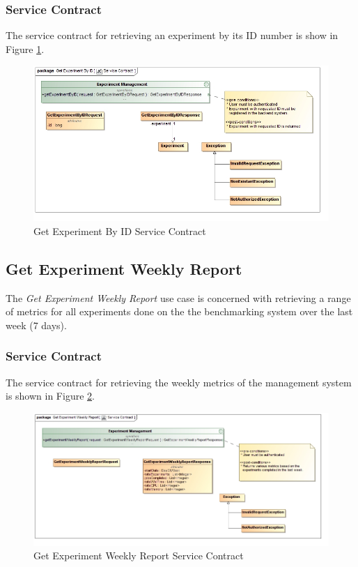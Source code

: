 \subsubsection{Service Contract}
The service contract for retrieving an experiment by its ID number is show in
Figure \ref{fig:getExperimentByIDServiceContract}.
\begin{figure}[H]
  \begin{center}
  \includegraphics[scale=0.38]{../Diagrams and Charts/Experiment/Get Experiment By ID Service Contract.jpg}
  \caption{Get Experiment By ID Service Contract}
  \label{fig:getExperimentByIDServiceContract}
  \end{center}
\end{figure}



\subsection {Get Experiment Weekly Report}
The \textit{Get Experiment Weekly Report} use case is concerned with retrieving
a range of metrics for all experiments done on the the benchmarking system over
the last week (7 days).

\subsubsection{Service Contract}
The service contract for retrieving the weekly metrics of the management system
is shown in Figure \ref{fig:getExperimentWeeklyReportServiceContract}.
\begin{figure}[H]
  \begin{center}
  \includegraphics[scale=0.38]{../Diagrams and Charts/Experiment/Get Experiment Weekly Report Service Contract.jpg}
  \caption{Get Experiment Weekly Report Service Contract}
  \label{fig:getExperimentWeeklyReportServiceContract}
  \end{center}
\end{figure}

